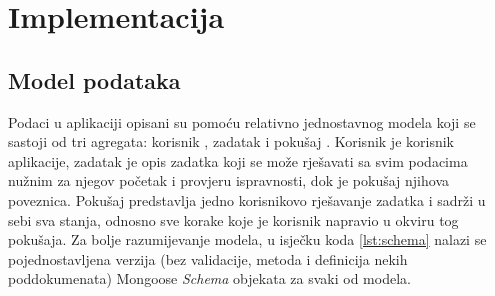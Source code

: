\documentclass[times, utf8, diplomski, numeric]{fer}
\begin{document}






\chapter{Implementacija}


\section{Model podataka} \label{sec:data}

Podaci u aplikaciji opisani su pomoću relativno jednostavnog modela koji se sastoji od tri agregata: korisnik , zadatak  i pokušaj .
Korisnik je korisnik aplikacije, zadatak je opis zadatka koji se može rješavati sa svim podacima nužnim za njegov početak i provjeru ispravnosti, dok je pokušaj njihova poveznica.
Pokušaj predstavlja jedno korisnikovo rješavanje zadatka i sadrži u sebi sva stanja, odnosno sve korake koje je korisnik napravio u okviru tog pokušaja.
Za bolje razumijevanje modela, u isječku koda \ref{lst:schema} nalazi se pojednostavljena verzija (bez validacije, metoda i definicija nekih poddokumenata) Mongoose \emph{Schema} objekata za svaki od modela.
\end{document}
